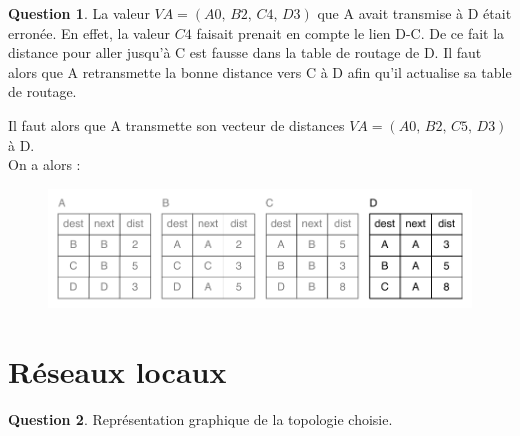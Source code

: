 \documentclass[11pt,english,french]{scrreprt}
\theoremstyle{remark}
\theoremstyle{definition}
\newtheorem{ques}{Question}[section]
\begin{document}
\begin{ques}
	La valeur $VA = (A0,\,B2,\,C4,\,D3)$ que A avait transmise à D était erronée. En effet, la valeur $C4$ faisait prenait en compte le lien D-C. De ce fait la distance pour aller jusqu'à C est fausse dans la table de routage de D. Il faut alors que A retransmette la bonne distance vers C à D afin qu'il actualise sa table de routage.
	
	Il faut alors que A transmette son vecteur de distances $VA=(A0,\,B2,\,C5,\,D3)$ à D.\\
	On a alors :
	\begin{figure}[h!]
		\center
		\includegraphics[scale=.7]{Exam2009/tables6}
	\end{figure}
\end{ques}
\clearpage
\section{Réseaux locaux} %

\begin{ques}
	Représentation graphique de la topologie choisie.
	\begin{figure}[h!]
	  \centering
	\end{figure}
\end{ques}
\end{document}
